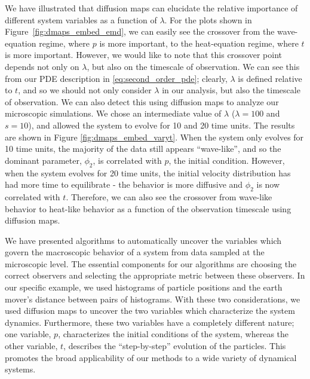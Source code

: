 \documentclass[prl, reprint, final, showkeys]{revtex4-1}
\begin{document}
We have illustrated that diffusion maps can elucidate the relative importance of different system variables as a function of $\lambda$.
%
For the plots shown in Figure~\ref{fig:dmaps_embed_emd}, we can easily see the crossover from the wave-equation regime, where $p$ is more important, to the heat-equation regime, where $t$ is more important. 
%
However, we would like to note that this crossover point depends not only on $\lambda$, but also on the timescale of observation.
%
We can see this from our PDE description in \eqref{eq:second_order_pde};
clearly, $\lambda$ is defined relative to $t$, and so we should not only consider $\lambda$ in our analysis, but also the timescale of observation.
%
We can also detect this using diffusion maps to analyze our microscopic simulations.
%
We chose an intermediate value of $\lambda$ ($\lambda=100$ and $s=10$), and allowed the system to evolve for 10 and 20 time units. 
%
The results are shown in Figure \ref{fig:dmaps_embed_varyt}.
%
When the system only evolves for 10 time units, the majority of the data still appears ``wave-like'', and so the dominant parameter, $\phi_2$, is correlated with $p$, the initial condition.
%
However, when the system evolves for 20 time units, the initial velocity distribution has had more time to equilibrate - the behavior is more diffusive and $\phi_2$ is now correlated with $t$. 
%
Therefore, we can also see the crossover from wave-like behavior to heat-like behavior as a function of the observation timescale using diffusion maps.

We have presented algorithms to automatically uncover the variables which govern the macroscopic behavior of a system from data sampled at the microscopic level.
%
The essential components for our algorithms are choosing the correct observers and selecting the appropriate metric between these observers.
%
In our specific example, we used histograms of particle positions and the earth mover's distance between pairs of histograms.
%
With these two considerations, we used diffusion maps to uncover the two variables which characterize the system dynamics.
%
Furthermore, these two variables have a completely different nature;
one variable, $p$, characterizes the initial conditions of the system, whereas the other variable, $t$, describes the ``step-by-step'' evolution of the particles. 
%
This promotes the broad applicability of our methods to a wide variety of dynamical systems. 





\end{document}

